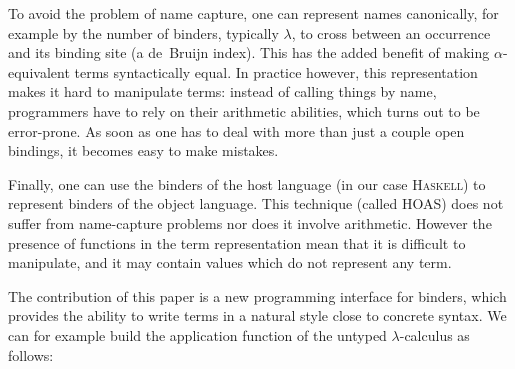 \documentclass[9pt,preprint,authoryear]{sigplanconf}
\begin{document}
%
To avoid the problem of name capture, one can represent names
    canonically, for example by the number of binders, typically $ \lambda $,
    to cross between an occurrence and its binding site (a de{~}Bruijn index). 
    This has the added benefit of making $ \alpha $-equivalent terms syntactically equal.
    In practice
    however, this representation makes it hard to manipulate terms{:}
    instead of calling things by name, programmers have to rely on their
    arithmetic abilities, which turns out to be error-prone. As soon as
    one has to deal with more than just a couple open bindings, it becomes
    easy to make mistakes.%


%
Finally, one can use the binders of the host language (in our case \textsc{Haskell})
    to represent binders of the object language. This technique (called HOAS)
    does not suffer
    from name-capture problems nor does it involve arithmetic. However the 
    presence of functions in the term representation mean that it is difficult 
    to manipulate, and it may contain values which do not represent any term.%


%
The contribution of this paper is a new programming interface for binders, which
    provides the ability to write terms in a natural style close to
    concrete syntax. We can for example build the application function
    of the untyped $ \lambda $-calculus as follows{:}%


%
%


{\nopagebreak }
\end{document}
